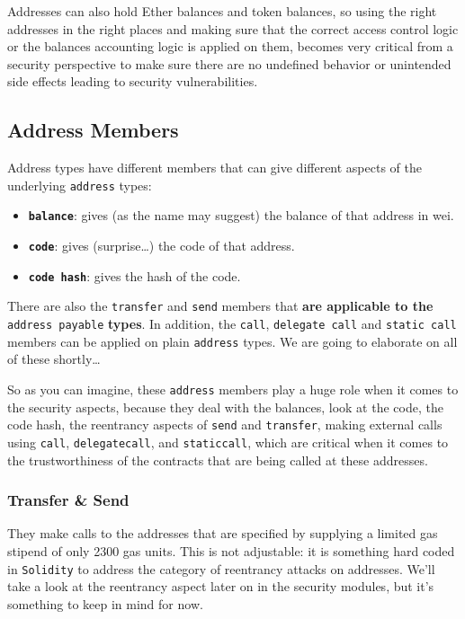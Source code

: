 Addresses can also hold Ether balances and token balances, so using the
right addresses in the right places and making sure that the correct
access control logic or the balances accounting logic is applied on
them, becomes very critical from a security perspective to make sure
there are no undefined behavior or unintended side effects leading to
security vulnerabilities.

\subsection{Address Members}\label{address-members}

Address types have different members that can give different aspects of
the underlying \texttt{address} types:

\begin{itemize}
\tightlist
\item
  \textbf{\texttt{balance}}: gives (as the name may suggest) the balance
  of that address in wei.
\item
  \textbf{\texttt{code}}: gives (surprise\ldots) the code of that
  address.
\item
  \textbf{\texttt{code\ hash}}: gives the hash of the code.
\end{itemize}

There are also the \texttt{transfer} and \texttt{send} members that
\textbf{are applicable to the} \texttt{address\ payable} \textbf{types}.
In addition, the \texttt{call}, \texttt{delegate\ call} and
\texttt{static\ call} members can be applied on plain \texttt{address}
types. We are going to elaborate on all of these shortly\ldots{}

So as you can imagine, these \texttt{address} members play a huge role
when it comes to the security aspects, because they deal with the
balances, look at the code, the code hash, the reentrancy aspects of
\texttt{send} and \texttt{transfer}, making external calls using
\texttt{call}, \texttt{delegatecall}, and \texttt{staticcall}, which are
critical when it comes to the trustworthiness of the contracts that are
being called at these addresses.

\subsubsection{Transfer \& Send}\label{transfer-send}

They make calls to the addresses that are specified by supplying a
limited gas stipend of only 2300 gas units. This is not adjustable: it
is something hard coded in \texttt{Solidity} to address the category of
reentrancy attacks on addresses. We'll take a look at the reentrancy
aspect later on in the security modules, but it's something to keep in
mind for now.

